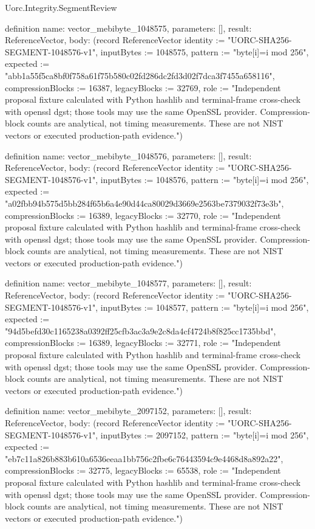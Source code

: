 \begin{lexlean}{Uorc.Integrity.SegmentReview}
\begin{semanticmodule}
definition{
  name: vector_mebibyte_1048575,
  parameters: [],
  result: ReferenceVector,
  body: (record ReferenceVector {identity := "UORC-SHA256-SEGMENT-1048576-v1", inputBytes := 1048575, pattern := "byte[i]=i mod 256", expected := "abb1a55f5ca8bf0f758a61f75b580c02fd286dc2fd3d02f7dca3f7455a658116", compressionBlocks := 16387, legacyBlocks := 32769, role := "Independent proposal fixture calculated with Python hashlib and terminal-frame cross-check with openssl dgst; those tools may use the same OpenSSL provider. Compression-block counts are analytical, not timing measurements. These are not NIST vectors or executed production-path evidence."})
}

definition{
  name: vector_mebibyte_1048576,
  parameters: [],
  result: ReferenceVector,
  body: (record ReferenceVector {identity := "UORC-SHA256-SEGMENT-1048576-v1", inputBytes := 1048576, pattern := "byte[i]=i mod 256", expected := "a02fbb94b575d5bb284f65b6a4e90d44ca80029d3669e2563be7379032f73e3b", compressionBlocks := 16389, legacyBlocks := 32770, role := "Independent proposal fixture calculated with Python hashlib and terminal-frame cross-check with openssl dgst; those tools may use the same OpenSSL provider. Compression-block counts are analytical, not timing measurements. These are not NIST vectors or executed production-path evidence."})
}

definition{
  name: vector_mebibyte_1048577,
  parameters: [],
  result: ReferenceVector,
  body: (record ReferenceVector {identity := "UORC-SHA256-SEGMENT-1048576-v1", inputBytes := 1048577, pattern := "byte[i]=i mod 256", expected := "94d5befd30c1165238a0392ff25cfb3ac3a9e2c8da4cf4724b8f825cc1735bbd", compressionBlocks := 16389, legacyBlocks := 32771, role := "Independent proposal fixture calculated with Python hashlib and terminal-frame cross-check with openssl dgst; those tools may use the same OpenSSL provider. Compression-block counts are analytical, not timing measurements. These are not NIST vectors or executed production-path evidence."})
}

definition{
  name: vector_mebibyte_2097152,
  parameters: [],
  result: ReferenceVector,
  body: (record ReferenceVector {identity := "UORC-SHA256-SEGMENT-1048576-v1", inputBytes := 2097152, pattern := "byte[i]=i mod 256", expected := "eb7c11a826b883b610a6536eeaa1bb756c2fbe6c76443594c9e4468d8a892a22", compressionBlocks := 32775, legacyBlocks := 65538, role := "Independent proposal fixture calculated with Python hashlib and terminal-frame cross-check with openssl dgst; those tools may use the same OpenSSL provider. Compression-block counts are analytical, not timing measurements. These are not NIST vectors or executed production-path evidence."})
}


\end{semanticmodule}
\end{lexlean}
